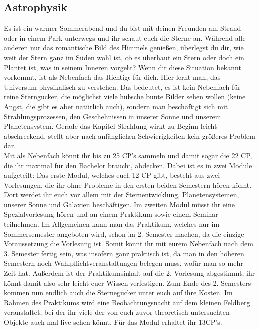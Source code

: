 \subsection{Astrophysik}

Es ist ein warmer Sommerabend und du bist mit deinen Freunden am Strand oder in einem Park unterwegs und ihr schaut euch die Sterne an.
Während alle anderen nur das romantische Bild des Himmels genießen, überlegst du dir, 
wie weit der Stern ganz im Süden wohl ist, ob es überhaut ein Stern oder doch ein Plantet ist, was in seinem Inneren vorgeht?
Wenn dir diese Situation bekannt vorkommt, ist  als Nebenfach das Richtige für dich.
Hier lernt man, das Universum physikalisch zu verstehen.
Das bedeutet, es ist kein Nebenfach für reine Sterngucker, die möglichst viele hübsche bunte Bilder sehen wollen (keine Angst, die gibt es aber natürlich auch),
sondern man beschäftigt sich mit Strahlungsprozessen, den Geschehnissen in unserer Sonne und unserem Planetensystem.
Gerade das Kapitel Strahlung wirkt zu Beginn leicht abschreckend, stellt aber nach anfänglichen Schwierigkeiten kein größeres Problem dar.\\
Mit  als Nebenfach könnt ihr bis zu 25 CP's sammeln und damit sogar die 22 CP, die ihr maximal für den Bachelor braucht, abdecken.
Dabei ist es in zwei Module aufgeteilt:
Das erste Modul, welches euch 12 CP gibt, besteht aus zwei Vorlesungen, die ihr ohne Probleme in den ersten beiden Semestern hören könnt.
Dort werdet ihr euch vor allem mit der Sternentwicklung, Planetensystemen, unserer Sonne und Galaxien beschäftigen.
Im zweiten Modul müsst ihr eine Spezialvorlesung hören und an einem Praktikum sowie einem Seminar teilnehmen.
Im Allgemeinen kann man das Praktikum, welches nur im Sommersemester angeboten wird, schon im 2. Semester machen, 
da die einzige Voraussetzung die  Vorlesung ist.
Somit könnt ihr mit eurem Nebenfach nach dem 3. Semester fertig sein, was insofern ganz praktisch ist, 
da man in den höheren Semestern noch Wahlpflichtveranstaltungen belegen muss, wofür man so mehr Zeit hat.
Außerdem ist der Praktikumsinhalt auf die 2. Vorlesung abgestimmt, 
ihr könnt damit also sehr leicht euer Wissen verfestigen.
Zum Ende des 2. Semesters kommen nun endlich auch die Sternegucker unter euch auf ihre Kosten.
Im Rahmen des Praktikums wird eine Beobachtungsnacht auf dem kleinen Feldberg veranstaltet, 
bei der ihr viele der von euch zuvor theoretisch untersuchten Objekte auch mal live sehen könnt.
Für das Modul  erhaltet ihr 13CP's.


